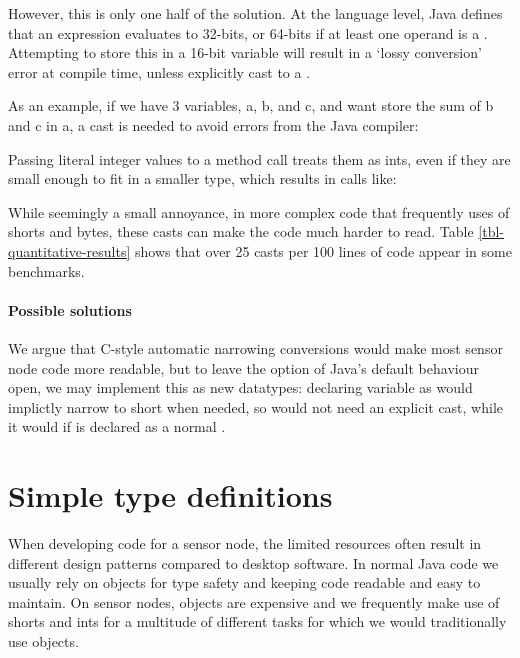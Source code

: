 However, this is only one half of the solution. At the language level, Java defines that an expression evaluates to 32-bits, or 64-bits if at least one operand is a . Attempting to store this in a 16-bit variable will result in a `lossy conversion' error at compile time, unless explicitly cast to a .

As an example, if we have 3  variables, a, b, and c, and want store the sum of b and c in a, a cast is needed to avoid errors from the Java compiler:


Passing literal integer values to a method call treats them as ints, even if they are small enough to fit in a smaller type, which results in calls like: 


While seemingly a small annoyance, in more complex code that frequently uses of shorts and bytes, these casts can make the code much harder to read. Table \ref{tbl-quantitative-results} shows that over 25 casts per 100 lines of code appear in some benchmarks.

\paragraph{Possible solutions}

We argue that C-style automatic narrowing conversions would make most sensor node code more readable, but to leave the option of Java's default behaviour open, we may implement this as new datatypes: declaring variable  as  would implictly narrow to short when needed, so  would not need an explicit cast, while it would if  is declared as a normal .




\section{Simple type definitions}
\label{sec-typedef}
When developing code for a sensor node, the limited resources often result in different design patterns compared to desktop software. In normal Java code we usually rely on objects for type safety and keeping code readable and easy to maintain. On sensor nodes, objects are expensive and we frequently make use of shorts and ints for a multitude of different tasks for which we would traditionally use objects.

